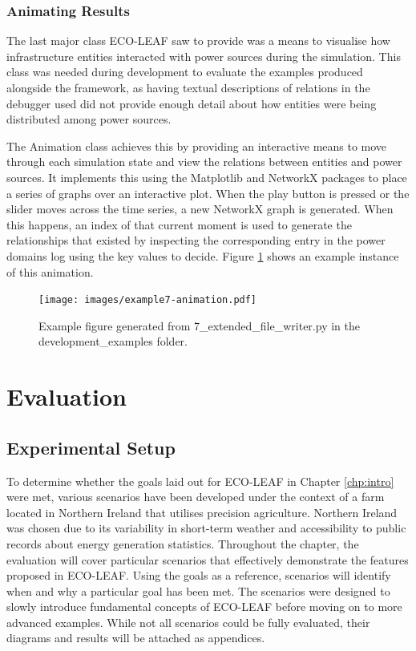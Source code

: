\documentclass{l4proj}
\begin{document}
\subsection{Animating Results}\label{subsec:imp:animation}
The last major class ECO-LEAF saw to provide was a means to visualise how infrastructure entities interacted with power sources during the simulation.
This class was needed during development to evaluate the examples produced alongside the framework, as having textual descriptions of relations in the debugger used did not provide enough detail about how entities were being distributed among power sources.

The Animation class achieves this by providing an interactive means to move through each simulation state and view the relations between entities and power sources.
It implements this using the Matplotlib and NetworkX packages to place a series of graphs over an interactive plot.
When the play button is pressed or the slider moves across the time series, a new NetworkX graph is generated.
When this happens, an index of that current moment is used to generate the relationships that existed by inspecting the corresponding entry in the power domains log using the key values to decide.
Figure \ref{fig:dev-example7-animation} shows an example instance of this animation.
\begin{figure}[h]
    \centering
    \texttt{[image: images/example7-animation.pdf]}
    ~
    \caption{Example figure generated from 7\_extended\_file\_writer.py in the development\_examples folder.}
    \label{fig:dev-example7-animation}
\end{figure}


\chapter{Evaluation} \label{chp:evaluation}

\section{Experimental Setup}\label{eval:sec:scenarios}
To determine whether the goals laid out for ECO-LEAF in Chapter \ref{chp:intro} were met, various scenarios have been developed under the context of a farm located in Northern Ireland that utilises precision agriculture.
Northern Ireland was chosen due to its variability in short-term weather and accessibility to public records about energy generation statistics.
Throughout the chapter, the evaluation will cover particular scenarios that effectively demonstrate the features proposed in ECO-LEAF.
Using the goals as a reference, scenarios will identify when and why a particular goal has been met.
The scenarios were designed to slowly introduce fundamental concepts of ECO-LEAF before moving on to more advanced examples.
While not all scenarios could be fully evaluated, their diagrams and results will be attached as appendices.
\end{document}
